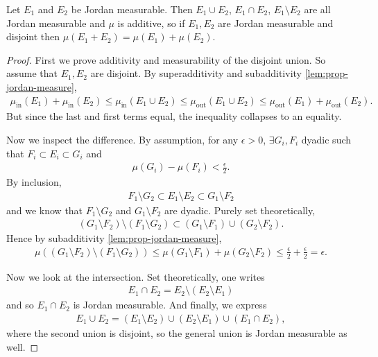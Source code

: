 \begin{prop}\label{prop:diff-int-un-jordan}
    Let $E_{1}$ and $E_{2}$ be Jordan measurable. Then $E_{1} \cup E_{2}$, $E_{1} \cap E_{2}$, $E_{1} \setminus E_{2}$ are all Jordan measurable and $\mu$ is additive, so if $E_{1}, E_{2}$ are Jordan measurable and disjoint then $\mu(E_{1} + E_{2}) = \mu(E_{1}) + \mu(E_{2})$.
\end{prop}
\begin{proof}
    First we prove additivity and measurability of the disjoint union. So assume that $E_{1}, E_{2}$ are disjoint. By superadditivity and subadditivity \ref{lem:prop-jordan-measure},
    \begin{align*}
        \mu_{\text{in}}(E_{1}) + \mu_{\text{in}}(E_{2}) \leq \mu_{\text{in}}(E_{1} \cup E_{2}) \leq \mu_{\text{out}}(E_{1} \cup E_{2}) \leq \mu_{\text{out}}(E_{1}) + \mu_{\text{out}}(E_{2}).
    \end{align*}
    But since the last and first terms equal, the inequality collapses to an equality.

    Now we inspect the difference. By assumption, for any $\epsilon > 0$, $\exists G_{i}, F_{i}$ dyadic such that $F_{i} \subset E_{i} \subset G_{i}$ and
    \begin{align*}
        \mu(G_{i}) - \mu(F_{i}) < \frac{\epsilon}{2}. 
    \end{align*}
    By inclusion,
    \begin{align*}
        F_{1} \setminus G_{2} \subset  E_{1} \setminus E_{2} \subset G_{1} \setminus F_{2}
    \end{align*}
    and we know that $F_{1} \setminus G_{2}$ and $G_{1} \setminus F_{2}$ are dyadic. Purely set theoretically,
    \begin{align*}
        (G_{1} \setminus F_{2}) \setminus (F_{1} \setminus G_{2}) \subset (G_{1} \setminus F_{1}) \cup (G_{2} \setminus F_{2}).
    \end{align*}
    Hence by subadditivity \ref{lem:prop-jordan-measure},
    \begin{align*}
        \mu( (G_{1} \setminus F_{2}) \setminus (F_{1} \setminus G_{2}) ) \leq \mu(G_{1} \setminus F_{1}) + \mu(G_{2} \setminus F_{2}) \leq \frac{\epsilon}{2} + \frac{\epsilon}{2} = \epsilon.
    \end{align*}

    Now we look at the intersection. Set theoretically, one writes
    \begin{align*}
        E_{1} \cap E_{2} = E_{2} \setminus (E_{2} \setminus E_{1})
    \end{align*}
    and so $E_{1} \cap E_{2}$ is Jordan measurable. And finally, we express 
    \begin{align*}
        E_{1} \cup E_{2} = (E_{1} \setminus E_{2}) \cup (E_{2} \setminus E_{1}) \cup (E_{1} \cap E_{2}),
    \end{align*}
    where the second union is disjoint, so the general union is Jordan measurable as well.
\end{proof}

